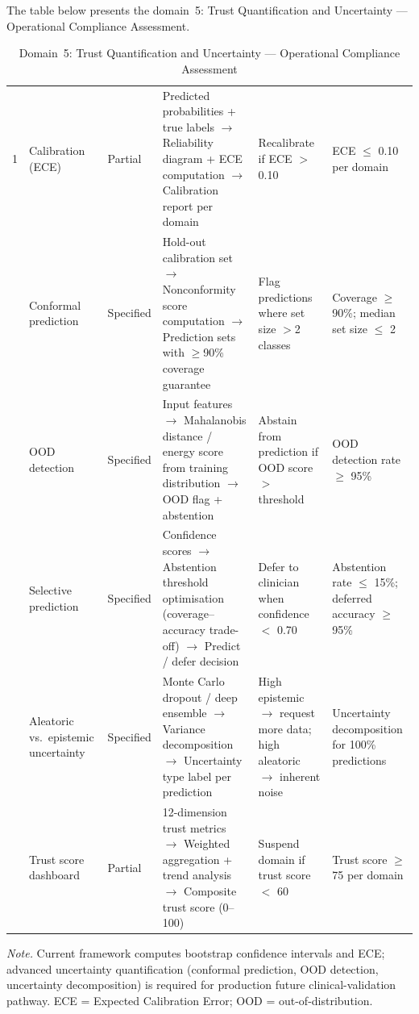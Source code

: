 \noindent The table below presents the domain~5: Trust Quantification and Uncertainty --- Operational Compliance Assessment.

\begin{table}[H]
\tablestripes
\tablefontsize
\caption[Trust Quantification and Uncertainty Assessment]{Domain~5: Trust Quantification and Uncertainty --- Operational Compliance Assessment}
\begin{tabularx}{\textwidth}{@{} p{0.4cm} p{2cm} p{1.4cm} L L p{1.8cm} @{}}
\toprule
\thead{\#} &  &  &  &  &  \\
 & Calibration (ECE) & Partial & Predicted probabilities + true labels $\to$ Reliability diagram + ECE computation $\to$ Calibration report per domain & Recalibrate if ECE $>$ 0.10 & ECE $\leq$ 0.10 per domain \\
 & Conformal prediction & Specified & Hold-out calibration set $\to$ Nonconformity score computation $\to$ Prediction sets with $\geq$90\% coverage guarantee & Flag predictions where set size $>$2 classes & Coverage $\geq$ 90\%; median set size $\leq$ 2 \\
 & OOD detection & Specified & Input features $\to$ Mahalanobis distance / energy score from training distribution $\to$ OOD flag + abstention & Abstain from prediction if OOD score $>$ threshold & OOD detection rate $\geq$ 95\% \\
 & Selective prediction & Specified & Confidence scores $\to$ Abstention threshold optimisation (coverage--accuracy trade-off) $\to$ Predict / defer decision & Defer to clinician when confidence $<$ 0.70 & Abstention rate $\leq$ 15\%; deferred accuracy $\geq$ 95\% \\
 & Aleatoric vs.\ epistemic uncertainty & Specified & Monte Carlo dropout / deep ensemble $\to$ Variance decomposition $\to$ Uncertainty type label per prediction & High epistemic $\to$ request more data; high aleatoric $\to$ inherent noise & Uncertainty decomposition for 100\% predictions \\
 & Trust score dashboard & Partial & 12-dimension trust metrics $\to$ Weighted aggregation + trend analysis $\to$ Composite trust score (0--100) & Suspend domain if trust score $<$ 60 & Trust score $\geq$ 75 per domain \\
\bottomrule
\end{tabularx}
\vspace{0.5em}\noindent\textit{Note.} Current framework computes bootstrap confidence intervals and ECE; advanced uncertainty quantification (conformal prediction, OOD detection, uncertainty decomposition) is required for production future clinical-validation pathway. ECE = Expected Calibration Error; OOD = out-of-distribution.
\end{table}

